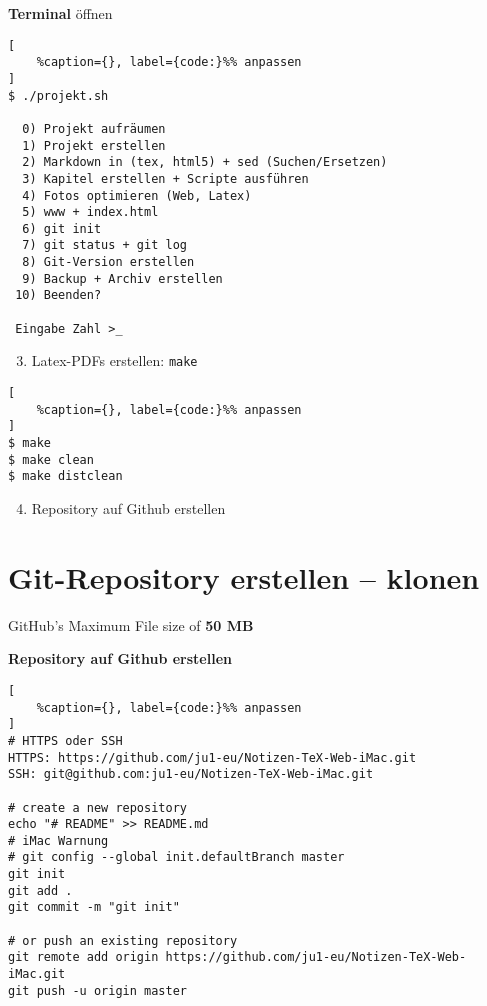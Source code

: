 \textbf{Terminal} öffnen

\lstset{language=Bash}%
\begin{lstlisting}[
	%caption={}, label={code:}%% anpassen
]
$ ./projekt.sh

  0) Projekt aufräumen
  1) Projekt erstellen
  2) Markdown in (tex, html5) + sed (Suchen/Ersetzen)
  3) Kapitel erstellen + Scripte ausführen
  4) Fotos optimieren (Web, Latex)
  5) www + index.html
  6) git init
  7) git status + git log
  8) Git-Version erstellen
  9) Backup + Archiv erstellen
 10) Beenden?

 Eingabe Zahl >_
\end{lstlisting}

\begin{enumerate}
\setcounter{enumi}{2}
\item
  Latex-PDFs erstellen: \verb|make|
\end{enumerate}

\lstset{language=Bash}%
\begin{lstlisting}[
	%caption={}, label={code:}%% anpassen
]
$ make
$ make clean
$ make distclean
\end{lstlisting}

\begin{enumerate}
\setcounter{enumi}{3}
\item
  Repository auf Github erstellen
\end{enumerate}

\section{Git-Repository erstellen --
klonen}\label{git-repository-erstellen-klonen}

GitHub's Maximum File size of \textbf{50 MB}

\textbf{Repository auf Github erstellen}

\lstset{language=Bash}%
\begin{lstlisting}[
	%caption={}, label={code:}%% anpassen
]
# HTTPS oder SSH
HTTPS: https://github.com/ju1-eu/Notizen-TeX-Web-iMac.git
SSH: git@github.com:ju1-eu/Notizen-TeX-Web-iMac.git

# create a new repository 
echo "# README" >> README.md
# iMac Warnung 
# git config --global init.defaultBranch master
git init
git add .
git commit -m "git init"
                
# or push an existing repository 
git remote add origin https://github.com/ju1-eu/Notizen-TeX-Web-iMac.git
git push -u origin master
\end{lstlisting}

